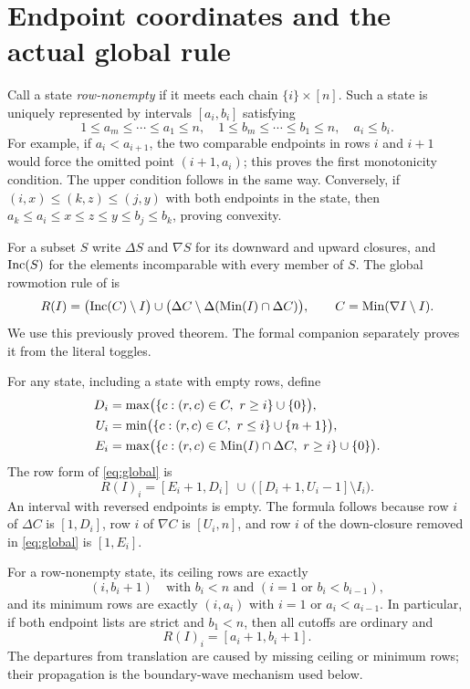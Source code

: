 \section{Endpoint coordinates and the actual global rule}\label{sec:endpoints}
Call a state \emph{row-nonempty} if it meets each chain $\{i\}\times[n]$. Such a state is uniquely represented by intervals $[a_i,b_i]$ satisfying
\begin{equation}\label{eq:antitone}
 1\le a_m\le\cdots\le a_1\le n,\quad
 1\le b_m\le\cdots\le b_1\le n,\quad a_i\le b_i.
\end{equation}
For example, if $a_i<a_{i+1}$, the two comparable endpoints in rows $i$ and $i+1$ would force the omitted point $(i+1,a_i)$; this proves the first monotonicity condition. The upper condition follows in the same way. Conversely, if $(i,x)\le(k,z)\le(j,y)$ with both endpoints in the state, then $a_k\le a_i\le x\le z\le y\le b_j\le b_k$, proving convexity.

For a subset $S$ write $\Delta S$ and $\nabla S$ for its downward and upward closures, and $\operatorname{Inc}(S)$ for the elements incomparable with every member of $S$. The global rowmotion rule of \cite[Theorem 1.1]{LLMSW} is
\begin{equation}\label{eq:global}
 R(I)=\bigl(\operatorname{Inc}(C)\setminus I\bigr)
 \cup\bigl(\Delta C\setminus\Delta(\operatorname{Min}(I)\cap\Delta C)\bigr),
 \qquad C=\operatorname{Min}(\nabla I\setminus I).
\end{equation}
We use this previously proved theorem. The formal companion separately proves it from the literal toggles.

For any state, including a state with empty rows, define
\begin{align*}
 D_i&=\max\bigl(\{c:(r,c)\in C,\ r\ge i\}\cup\{0\}\bigr),\\
 U_i&=\min\bigl(\{c:(r,c)\in C,\ r\le i\}\cup\{n+1\}\bigr),\\
 E_i&=\max\bigl(\{c:(r,c)\in\operatorname{Min}(I)\cap\Delta C,\ r\ge i\}\cup\{0\}\bigr).
\end{align*}
The row form of \eqref{eq:global} is
\begin{equation}\label{eq:row-rule}
 R(I)_i=[E_i+1,D_i]\ \cup\ \bigl([D_i+1,U_i-1]\setminus I_i\bigr).
\end{equation}
An interval with reversed endpoints is empty. The formula follows because row $i$ of $\Delta C$ is $[1,D_i]$, row $i$ of $\nabla C$ is $[U_i,n]$, and row $i$ of the down-closure removed in \eqref{eq:global} is $[1,E_i]$.

For a row-nonempty state, its ceiling rows are exactly
\[
 (i,b_i+1)\quad\text{with }b_i<n\text{ and }(i=1\text{ or }b_i<b_{i-1}),
\]
and its minimum rows are exactly $(i,a_i)$ with $i=1$ or $a_i<a_{i-1}$. In particular, if both endpoint lists are strict and $b_1<n$, then all cutoffs are ordinary and
\begin{equation}\label{eq:translation}
 R(I)_i=[a_i+1,b_i+1].
\end{equation}
The departures from translation are caused by missing ceiling or minimum rows; their propagation is the boundary-wave mechanism used below.

